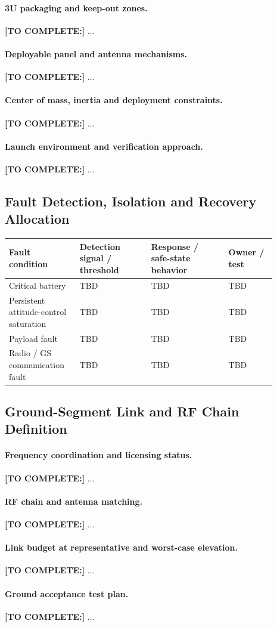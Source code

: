 \paragraph{3U packaging and keep-out zones.} \textbf{[TO COMPLETE:]} ...
\paragraph{Deployable panel and antenna mechanisms.} \textbf{[TO COMPLETE:]} ...
\paragraph{Center of mass, inertia and deployment constraints.} \textbf{[TO COMPLETE:]} ...
\paragraph{Launch environment and verification approach.} \textbf{[TO COMPLETE:]} ...

\subsection{Fault Detection, Isolation and Recovery Allocation}\label{sec:fdir-allocation}
\begin{longtable}{p{0.23\linewidth}p{0.24\linewidth}p{0.26\linewidth}p{0.16\linewidth}}
\toprule
Fault condition & Detection signal / threshold & Response / safe-state behavior & Owner / test \\
\midrule
\endhead
Critical battery & TBD & TBD & TBD \\
Persistent attitude-control saturation & TBD & TBD & TBD \\
Payload fault & TBD & TBD & TBD \\
Radio / GS communication fault & TBD & TBD & TBD \\
\bottomrule
\end{longtable}

\subsection{Ground-Segment Link and RF Chain Definition}\label{sec:rf-chain}
\paragraph{Frequency coordination and licensing status.} \textbf{[TO COMPLETE:]} ...
\paragraph{RF chain and antenna matching.} \textbf{[TO COMPLETE:]} ...
\paragraph{Link budget at representative and worst-case elevation.} \textbf{[TO COMPLETE:]} ...
\paragraph{Ground acceptance test plan.} \textbf{[TO COMPLETE:]} ...
